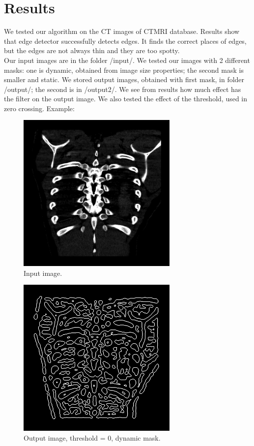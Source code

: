 \documentclass[a4paper,10pt]{article}
\begin{document}
\section{Results}
We tested our algorithm on the CT images of CTMRI database. Results show that edge detector successfully detects edges. It finds the correct places of edges, but the edges are not always thin and they are too spotty.\\
Our input images are in the folder /input/. We tested our images with 2 different masks: one is dynamic, obtained from image size properties; the second mask is smaller and static. We stored output images, obtained with first mask, in folder /output/; the second is in /output2/. We see from results how much effect has the filter on the output image.
We also tested the effect of the threshold, used in zero crossing.
Example:
\begin{figure}[H]
  \caption{Input image.}
  \centering
    \includegraphics[width=0.7\textwidth]{0099.png}
\end{figure}

\begin{figure}[H]
  \caption{Output image, threshold = 0, dynamic mask.}
  \centering
    \includegraphics[width=0.7\textwidth]{out.png}
\end{figure}
\end{document}
